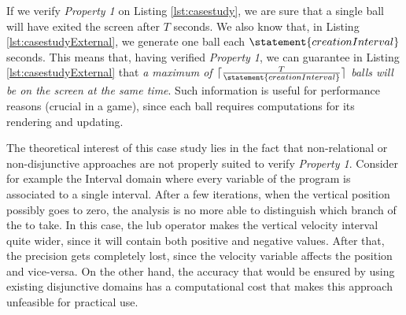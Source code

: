 If we verify \emph{Property 1} on Listing \ref{lst:casestudy}, we are sure that a single ball will have exited the screen after $T$ seconds. We also know that, in Listing \ref{lst:casestudyExternal}, we generate one ball each $\statement{creationInterval}$ seconds. This means that, having verified \emph{Property 1}, we can guarantee in Listing \ref{lst:casestudyExternal} that \emph{a maximum of $\lceil \frac{T}{\statement{creationInterval}} \rceil$ balls will be on the screen at the same time}. Such information is useful for performance reasons (crucial in a game), since each ball requires computations for its rendering and updating. 


The theoretical interest of this case study lies in the fact that non-relational or non-disjunctive approaches are not properly suited to verify \emph{Property 1}. Consider for example the Interval domain where every variable of the program is associated to a single interval. After a few iterations, when the vertical position possibly goes to zero, the analysis is no more able to distinguish which branch of the  to take. In this case, the lub operator makes the vertical velocity interval quite wider, since it will contain both positive and negative values. After that, the precision gets completely lost, since the velocity variable affects the position and vice-versa. On the other hand, the accuracy that would be ensured by using existing disjunctive domains has a computational cost that makes this approach unfeasible for practical use.

